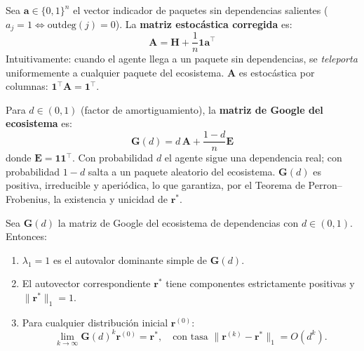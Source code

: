 \begin{definicion}
Sea $\mathbf{a} \in \{0,1\}^n$ el vector indicador de paquetes sin dependencias
salientes ($a_j = 1 \Leftrightarrow \text{outdeg}(j)=0$). La \textbf{matriz
estocástica corregida} es:
\[
    \mathbf{A} = \mathbf{H} + \frac{1}{n}\mathbf{1}\mathbf{a}^\top
\]
Intuitivamente: cuando el agente llega a un paquete sin dependencias, se
\textit{teleporta} uniformemente a cualquier paquete del ecosistema.
$\mathbf{A}$ es estocástica por columnas: $\mathbf{1}^\top \mathbf{A} =
\mathbf{1}^\top$.
\end{definicion}

\begin{definicion}
Para $d \in (0,1)$ (factor de amortiguamiento), la \textbf{matriz de Google
del ecosistema} es:
\[
    \boxed{\mathbf{G}(d) = d\,\mathbf{A} + \frac{1-d}{n}\mathbf{E}}
\]
donde $\mathbf{E} = \mathbf{1}\mathbf{1}^\top$. Con probabilidad $d$ el agente
sigue una dependencia real; con probabilidad $1-d$ salta a un paquete aleatorio
del ecosistema. $\mathbf{G}(d)$ es positiva, irreducible y aperiódica, lo que
garantiza, por el Teorema de Perron–Frobenius, la existencia y unicidad de
$\mathbf{r}^*$.
\end{definicion}

\begin{teorema}
Sea $\mathbf{G}(d)$ la matriz de Google del ecosistema de dependencias con
$d \in (0,1)$. Entonces:
\begin{enumerate}
    \item $\lambda_1 = 1$ es el autovalor dominante simple de $\mathbf{G}(d)$.
    \item El autovector correspondiente $\mathbf{r}^*$ tiene componentes
          estrictamente positivas y $\|\mathbf{r}^*\|_1 = 1$.
    \item Para cualquier distribución inicial $\mathbf{r}^{(0)}$:
          \[
              \lim_{k\to\infty} \mathbf{G}(d)^k \mathbf{r}^{(0)} = \mathbf{r}^*,
              \quad \text{con tasa } \|\mathbf{r}^{(k)} - \mathbf{r}^*\|_1 = O(d^k).
          \]
\end{enumerate}
\end{teorema}

